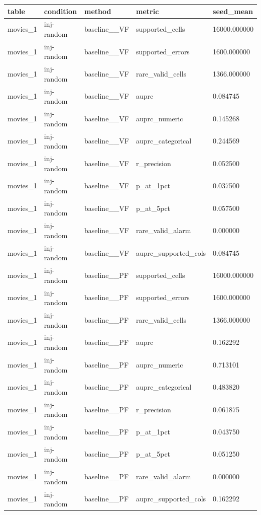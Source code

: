 \begin{tabular}{lllll}
\hline
table & condition & method & metric & seed\_mean \\
\hline
movies\_1 & inj-random & baseline\_\_VF & supported\_cells & 16000.000000 \\
movies\_1 & inj-random & baseline\_\_VF & supported\_errors & 1600.000000 \\
movies\_1 & inj-random & baseline\_\_VF & rare\_valid\_cells & 1366.000000 \\
movies\_1 & inj-random & baseline\_\_VF & auprc & 0.084745 \\
movies\_1 & inj-random & baseline\_\_VF & auprc\_numeric & 0.145268 \\
movies\_1 & inj-random & baseline\_\_VF & auprc\_categorical & 0.244569 \\
movies\_1 & inj-random & baseline\_\_VF & r\_precision & 0.052500 \\
movies\_1 & inj-random & baseline\_\_VF & p\_at\_1pct & 0.037500 \\
movies\_1 & inj-random & baseline\_\_VF & p\_at\_5pct & 0.057500 \\
movies\_1 & inj-random & baseline\_\_VF & rare\_valid\_alarm & 0.000000 \\
movies\_1 & inj-random & baseline\_\_VF & auprc\_supported\_cols & 0.084745 \\
movies\_1 & inj-random & baseline\_\_PF & supported\_cells & 16000.000000 \\
movies\_1 & inj-random & baseline\_\_PF & supported\_errors & 1600.000000 \\
movies\_1 & inj-random & baseline\_\_PF & rare\_valid\_cells & 1366.000000 \\
movies\_1 & inj-random & baseline\_\_PF & auprc & 0.162292 \\
movies\_1 & inj-random & baseline\_\_PF & auprc\_numeric & 0.713101 \\
movies\_1 & inj-random & baseline\_\_PF & auprc\_categorical & 0.483820 \\
movies\_1 & inj-random & baseline\_\_PF & r\_precision & 0.061875 \\
movies\_1 & inj-random & baseline\_\_PF & p\_at\_1pct & 0.043750 \\
movies\_1 & inj-random & baseline\_\_PF & p\_at\_5pct & 0.051250 \\
movies\_1 & inj-random & baseline\_\_PF & rare\_valid\_alarm & 0.000000 \\
movies\_1 & inj-random & baseline\_\_PF & auprc\_supported\_cols & 0.162292 \\

\end{tabular}
